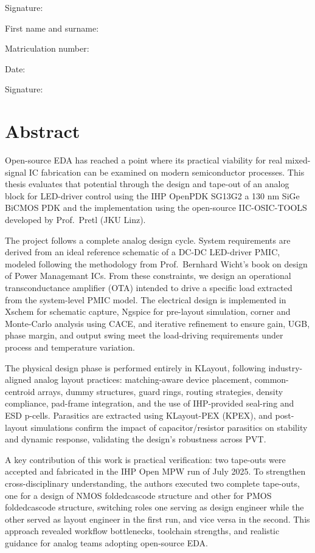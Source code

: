 \documentclass[
  11pt,
  a4paper,
  oneside]{scrbook}
\begin{document}
Signature:

First name and surname:

Matriculation number:

Date:

Signature:


\chapter*{Abstract}\label{abstract}


Open-source EDA has reached a point where its practical viability for
real mixed-signal IC fabrication can be examined on modern semiconductor
processes. This thesis evaluates that potential through the design and
tape-out of an analog block for LED-driver control using the IHP OpenPDK
SG13G2 a 130 nm SiGe BiCMOS PDK and the implementation using the
open-source IIC-OSIC-TOOLS developed by Prof.~Pretl (JKU Linz).

The project follows a complete analog design cycle. System requirements
are derived from an ideal reference schematic of a DC-DC LED-driver
PMIC, modeled following the methodology from Prof.~Bernhard Wicht's book
on design of Power Managemant ICs. From these constraints, we design an
operational transconductance amplifier (OTA) intended to drive a
specific load extracted from the system-level PMIC model. The electrical
design is implemented in Xschem for schematic capture, Ngspice for
pre-layout simulation, corner and Monte-Carlo analysis using CACE, and
iterative refinement to ensure gain, UGB, phase margin, and output swing
meet the load-driving requirements under process and temperature
variation.

The physical design phase is performed entirely in KLayout, following
industry-aligned analog layout practices: matching-aware device
placement, common-centroid arrays, dummy structures, guard rings,
routing strategies, density compliance, pad-frame integration, and the
use of IHP-provided seal-ring and ESD p-cells. Parasitics are extracted
using KLayout-PEX (KPEX), and post-layout simulations confirm the impact
of capacitor/resistor parasitics on stability and dynamic response,
validating the design's robustness across PVT.

A key contribution of this work is practical verification: two tape-outs
were accepted and fabricated in the IHP Open MPW run of July 2025. To
strengthen cross-disciplinary understanding, the authors executed two
complete tape-outs, one for a design of NMOS foldedcascode structure and
other for PMOS foldedcascode structure, switching roles one serving as
design engineer while the other served as layout engineer in the first
run, and vice versa in the second. This approach revealed workflow
bottlenecks, toolchain strengths, and realistic guidance for analog
teams adopting open-source EDA.
\end{document}
